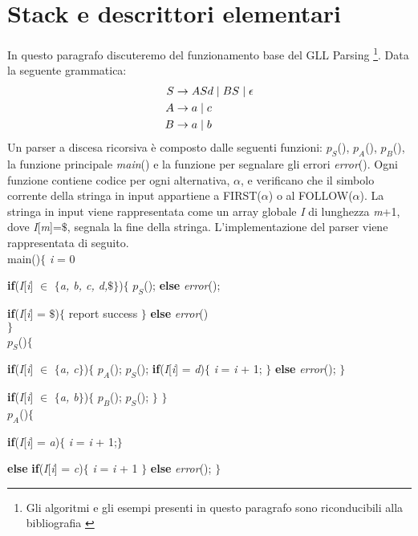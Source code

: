 \section{Stack e descrittori elementari}\label{par1}
In questo paragrafo discuteremo del funzionamento base del GLL Parsing \footnote{Gli algoritmi e gli esempi presenti in questo paragrafo sono riconducibili alla bibliografia \cite{pubblicazione: scott}}. Data la seguente grammatica:
\begin{align}\label{gram3}
	S & \to ASd \mid BS \mid \epsilon \notag \\
	A & \to a \mid c \notag \\
	B & \to a \mid b 
\end{align}
Un parser a discesa ricorsiva \cite{pubblicazione: scott} è composto dalle seguenti funzioni: $p_S$(), $p_A$(), $p_B$(), la funzione principale \textit{main}() e la funzione per segnalare gli errori \textit{error}(). Ogni funzione contiene codice per ogni alternativa, $\alpha$, e verificano che il simbolo corrente della stringa in input appartiene a FIRST($\alpha$) o al FOLLOW($\alpha$). La stringa in input viene rappresentata come un array globale \textit{I} di lunghezza \textit{m}+1, dove \textit{I}[\textit{m}]=$\$$, segnala la fine della stringa. L'implementazione del parser viene rappresentata di seguito.\\
main()$\{$ \textit{i} = 0 \par
\hspace{1cm}\textbf{if}(\textit{I}[\textit{i}] $\in$ $\{$\textit{a, b, c, d,$\$$}$\}$)$\{$ $p_S$(); \textbf{else} \textit{error}();\par
\hspace{1cm}\textbf{if}(\textit{I}[\textit{i}] = $\$$)$\{$ report success $\}$ \textbf{else} \textit{error}()\\	
$\}$\\
$p_S$()$\{$ \par
\hspace{0.5cm}\textbf{if}(\textit{I}[\textit{i}] $\in$ $\{$\textit{a, c}$\}$)$\{$ $p_A$(); $p_S$(); \textbf{if}(\textit{I}[\textit{i}] = \textit{d})$\{$ \textit{i} = \textit{i} + 1; $\}$ \textbf{else} \textit{error}(); $\}$\par
\hspace{0.5cm}\textbf{if}(\textit{I}[\textit{i}] $\in$ $\{$\textit{a, b}$\}$)$\{$ $p_B$(); $p_S$(); $\}$ $\}$\\
$p_A$()$\{$ \par
\hspace{0.5cm}\textbf{if}(\textit{I}[\textit{i}] = \textit{a})$\{$ \textit{i} = \textit{i} + 1;$\}$\par \hspace{0.5cm}\textbf{else} \textbf{if}(\textit{I}[\textit{i}] = \textit{c})$\{$ \textit{i} = \textit{i} + 1 $\}$ \textbf{else} \textit{error}(); $\}$\\
